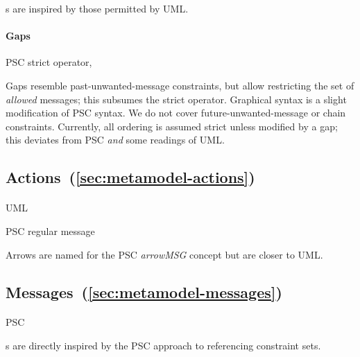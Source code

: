 \mloopbound s are inspired by those permitted by UML.

\paragraph{Gaps}
\begin{featset}
\item[PSC] strict operator, 
\end{featset}

Gaps resemble past-unwanted-message constraints, but
allow restricting the set of \emph{allowed} messages;
this subsumes the strict operator.  Graphical syntax is a slight
modification of PSC syntax.  We do not cover
future-unwanted-message or chain constraints.  Currently, all
ordering is assumed strict unless modified by a gap; this
deviates from PSC \emph{and} some readings of UML.
    
\subsection{Actions~(\ref{sec:metamodel-actions})}

\paragraph{\marrowaction}
\begin{featset}
\item[UML] 
\item[PSC] regular message
\end{featset}

Arrows are named for the PSC \emph{arrowMSG} concept but are closer
to UML.
      
\subsection{Messages~(\ref{sec:metamodel-messages})}

\paragraph{\mmessageset}
\begin{featset}
\item[PSC] 
\end{featset}

\mrefmessageset s are directly inspired by the PSC approach to referencing constraint sets.


